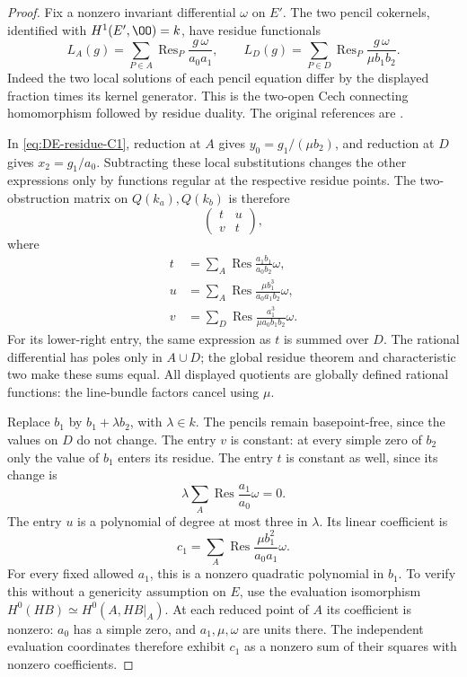 \begin{proof}
Fix a nonzero invariant differential $\omega$ on $E'$.
The two pencil cokernels, identified with $H^1(E',\OO)=k$, have
residue functionals
\[
 L_A(g)=\sum_{P\in A}\operatorname{Res}_P
              \frac{g\,\omega}{a_0a_1},\qquad
 L_D(g)=\sum_{P\in D}\operatorname{Res}_P
              \frac{g\,\omega}{\mu b_1b_2}.
\]
Indeed the two local solutions of each pencil equation differ by
the displayed fraction times its kernel generator.  This is the
two-open Cech connecting homomorphism followed by residue duality.
The original references are \cite[Theorem~2 and Theorem~3 with its
corollary, pp.~155--156; Section~4, Theorem~5 and its corollary,
pp.~157--159]{Tate1968Residues}.

In \eqref{eq:DE-residue-C1}, reduction at $A$ gives
$y_0=g_1/(\mu b_2)$, and reduction at $D$ gives $x_2=g_1/a_0$.
Subtracting these local substitutions changes the other expressions
only by functions regular at the respective residue points.
The two-obstruction matrix on $Q(k_a),Q(k_b)$ is therefore
\[
 \begin{pmatrix}t&u\\v&t\end{pmatrix},
\]
where
\[
\begin{split}
 t&=\sum_A\operatorname{Res}\frac{a_1b_1}{a_0b_2}\omega,\\
 u&=\sum_A\operatorname{Res}\frac{\mu b_1^3}{a_0a_1b_2}\omega,\\
 v&=\sum_D\operatorname{Res}\frac{a_1^3}{\mu a_0b_1b_2}\omega .
\end{split}
\]
For its lower-right entry, the same expression as $t$ is summed
over $D$.  The rational differential has poles only in $A\cup D$;
the global residue theorem and characteristic two make these sums
equal.  All displayed quotients are globally defined rational
functions: the line-bundle factors cancel using $\mu$.

Replace $b_1$ by $b_1+\lambda b_2$, with $\lambda\in k$.
The pencils remain basepoint-free, since the values on $D$ do not
change.  The entry $v$ is constant: at every simple zero of $b_2$
only the value of $b_1$ enters its residue.
The entry $t$ is constant as well, since its change is
\[
 \lambda\sum_A\operatorname{Res}\frac{a_1}{a_0}\omega=0.
\]
The entry $u$ is a polynomial of degree at most three in $\lambda$.
Its linear coefficient is
\[
 c_1=\sum_A\operatorname{Res}\frac{\mu b_1^2}{a_0a_1}\omega.
\]
For every fixed allowed $a_1$, this is a nonzero quadratic polynomial
in $b_1$.  To verify this without a genericity assumption on $E$,
use the evaluation isomorphism $H^0(HB)\simeq H^0(A,HB|_A)$.
At each reduced point of $A$ its coefficient is nonzero:
$a_0$ has a simple zero, and $a_1,\mu,\omega$ are units there.
The independent evaluation coordinates therefore exhibit $c_1$
as a nonzero sum of their squares with nonzero coefficients.


\end{proof}
